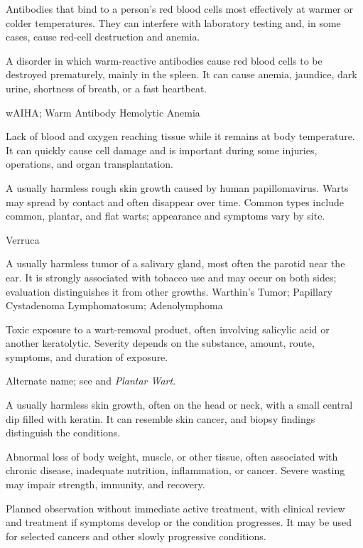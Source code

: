  Antibodies that bind to a person's red blood cells most effectively at warmer or colder temperatures. They can interfere with laboratory testing and, in some cases, cause red-cell destruction and anemia.

 A disorder in which warm-reactive antibodies cause red blood cells to be destroyed prematurely, mainly in the spleen. It can cause anemia, jaundice, dark urine, shortness of breath, or a fast heartbeat.

\synonyms
wAIHA; Warm Antibody Hemolytic Anemia

 Lack of blood and oxygen reaching tissue while it remains at body temperature. It can quickly cause cell damage and is important during some injuries, operations, and organ transplantation.

 A usually harmless rough skin growth caused by human papillomavirus. Warts may spread by contact and often disappear over time. Common types include common, plantar, and flat warts; appearance and symptoms vary by site.

\synonyms
Verruca

 A usually harmless tumor of a salivary gland, most often the parotid near the ear. It is strongly associated with tobacco use and may occur on both sides; evaluation distinguishes it from other growths.
\synonyms
Warthin's Tumor; Papillary Cystadenoma Lymphomatosum; Adenolymphoma

 Toxic exposure to a wart-removal product, often involving salicylic acid or another keratolytic. Severity depends on the substance, amount, route, symptoms, and duration of exposure.

 Alternate name; see  and \textit{Plantar Wart}.

 A usually harmless skin growth, often on the head or neck, with a small central dip filled with keratin. It can resemble skin cancer, and biopsy findings distinguish the conditions.

 Abnormal loss of body weight, muscle, or other tissue, often associated with chronic disease, inadequate nutrition, inflammation, or cancer. Severe wasting may impair strength, immunity, and recovery.

 Planned observation without immediate active treatment, with clinical review and treatment
if symptoms develop or the condition progresses. It may be used for selected cancers and other slowly progressive
conditions.

